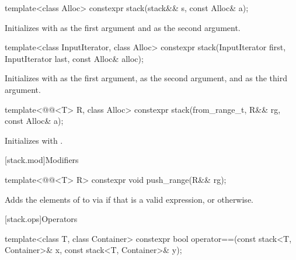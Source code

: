 %
\begin{itemdecl}
template<class Alloc> constexpr stack(stack&& s, const Alloc& a);
\end{itemdecl}

\begin{itemdescr}
\pnum
\effects
Initializes  with  as the first argument and 
as the second argument.
\end{itemdescr}

%
\begin{itemdecl}
template<class InputIterator, class Alloc>
  constexpr stack(InputIterator first, InputIterator last, const Alloc& alloc);
\end{itemdecl}

\begin{itemdescr}
\pnum
\effects
Initializes  with
 as the first argument,
 as the second argument, and
 as the third argument.
\end{itemdescr}

%
\begin{itemdecl}
template<@@<T> R, class Alloc>
  constexpr stack(from_range_t, R&& rg, const Alloc& a);
\end{itemdecl}

\begin{itemdescr}
\pnum
\effects
Initializes
 with .
\end{itemdescr}

[stack.mod]{Modifiers}

%
\begin{itemdecl}
template<@@<T> R>
  constexpr void push_range(R&& rg);
\end{itemdecl}

\begin{itemdescr}
\pnum
\effects
Adds the elements of  to 
via  if that is a valid expression,
or  otherwise.
\end{itemdescr}

[stack.ops]{Operators}

%
\begin{itemdecl}
template<class T, class Container>
  constexpr bool operator==(const stack<T, Container>& x, const stack<T, Container>& y);
\end{itemdecl}


